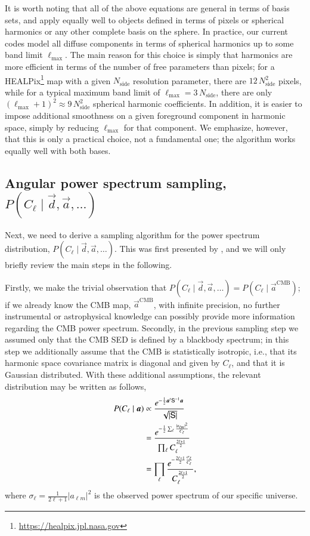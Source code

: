 \documentclass[twocolumn]{aa}
\renewcommand{\d}[0]{\vec{d}}
\renewcommand{\a}[0]{\vec{a}}
\renewcommand{\S}[0]{\tens{S}}
\begin{document}
It is worth noting that all of the above equations are general in
terms of basis sets, and apply equally well to objects defined in
terms of pixels or spherical harmonics or any other complete basis on
the sphere. In practice, our current codes model all diffuse
components in terms of spherical harmonics up to some band limit
$\ell_{\mathrm{max}}$. The main reason for this choice is simply that
harmonics are more efficient in terms of the number of free parameters
than pixels; for a HEALPix\footnote{\url{https://healpix.jpl.nasa.gov}} map \citep{gorski2005} with a given $N_{\mathrm{side}}$
resolution parameter, there are $12\,N_{\mathrm{side}}^2$ pixels,
while for a typical maximum band limit of
$\ell_{\mathrm{max}}=3\,N_{\mathrm{side}}$, there are only
$(\ell_{\mathrm{max}}+1)^2 \approx 9\,N_{\mathrm{side}}^2$ spherical
harmonic coefficients. In addition, it is easier to impose additional
smoothness on a given foreground component in harmonic space, simply
by reducing $\ell_{\mathrm{max}}$ for that component. We emphasize,
however, that this is only a practical choice, not a fundamental one;
the algorithm works equally well with both bases.

\subsection{Angular power spectrum sampling, $P(C_{\ell}\mid\d, \a, \ldots)$}
\label{sec:cl_sampling}

Next, we need to derive a sampling algorithm for the power spectrum
distribution, $P(C_{\ell}\mid\d, \a, \ldots)$. This was first
presented by \citet{wandelt2004}, and we will only briefly review the
main steps in the following.

Firstly, we make the trivial observation that ${P(C_{\ell}\mid\d, \a,
\ldots) = P(C_{\ell}\mid\a^{\mathrm{CMB}})}$; if we already know the
CMB map, $\a^{\mathrm{CMB}}$, with infinite precision, no further
instrumental or astrophysical knowledge can possibly provide more
information regarding the CMB power spectrum. Secondly, in the
previous sampling step we assumed only that the CMB SED is defined by
a blackbody spectrum; in this step we additionally assume that the CMB
is statistically isotropic, i.e., that its harmonic space covariance
matrix is diagonal and given by $C_{\ell}$, and that it is Gaussian
distributed. With these additional assumptions, the relevant
distribution may be written as follows,
\begin{align}
  P(C_{\ell}\mid\a) &\propto
  \frac{e^{-\frac{1}{2}\a^t\S^{-1}\a}}{\sqrt{|\S|}}\\
  &=\frac{e^{-\frac{1}{2}\sum_{\ell} \frac{|a_{\ell
          m}|^2}{C_{\ell}}}}{\prod_{\ell}
    C_{\ell}^{\frac{2\ell+1}{2}}}\\
&= \prod_{\ell}
  \frac{e^{-\frac{2\ell+1}{2}\frac{\sigma_{\ell}}{C_{\ell}}}}{C_{\ell}^{\frac{2\ell+1}{2}}},
  \label{eq:invgamma}
\end{align}
where $\sigma_{\ell} = \frac{1}{2\ell+1}|a_{\ell m}|^2$ is the
observed power spectrum of our specific universe.
\end{document}
